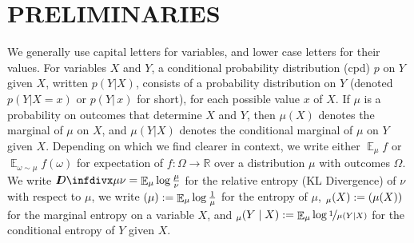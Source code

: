 \documentclass[twoside]{article}
\theoremstyle{plain}
\theoremstyle{definition}
\let\H\relax
\DeclareMathOperator{\H}{\mathrm{H}} %
\DeclareMathOperator*{\Ex}{\mathbb{E}} %
\newcommand{\thickD}{I\mkern-8muD}
\newcommand{\kldiv}{\thickD\infdivx}
\begin{document}
\section{PRELIMINARIES}
We generally use capital letters for variables, and lower case letters for their values.
For variables $X$ and $Y$, a conditional probability distribution (cpd) $p$ on $Y$ given $X$, written $p(Y|X)$, consists of a probability distribution on $Y$ (denoted $p(Y| X\!=\!x)$ or $p(Y|\,x)$ for short), for each possible value $x$ of $X$.
If $\mu$ is a probability on outcomes that determine $X$ and $Y$,
then $\mu(X)$ denotes the marginal of $\mu$ on $X$, and $\mu(Y|X)$
denotes the conditional marginal of $\mu$ on  $Y$ given $X$.
Depending on which we find clearer in context, we write either $\Ex_\mu f$ or $\Ex_{\omega \sim \mu} f(\omega)$ for expectation of $f : \Omega \to \mathbb R$ over a distribution $\mu$ with outcomes $\Omega$.
We write $\kldiv\mu\nu = \Ex_\mu \log \frac{\mu}{\nu}$ for the relative entropy (KL Divergence) of $\nu$ with respect to $\mu$,
we write $\H(\mu) := \Ex_\mu \log\frac1\mu$ for the entropy of $\mu$, $\H_\mu(X):= \H(\mu(X))$ for the marginal entropy on a variable $X$, and $\H_\mu(Y \mid X):= \Ex_\mu \log \nicefrac1{\mu(Y|X)}$ for the conditional entropy of $Y$ given $X$.
\end{document}
